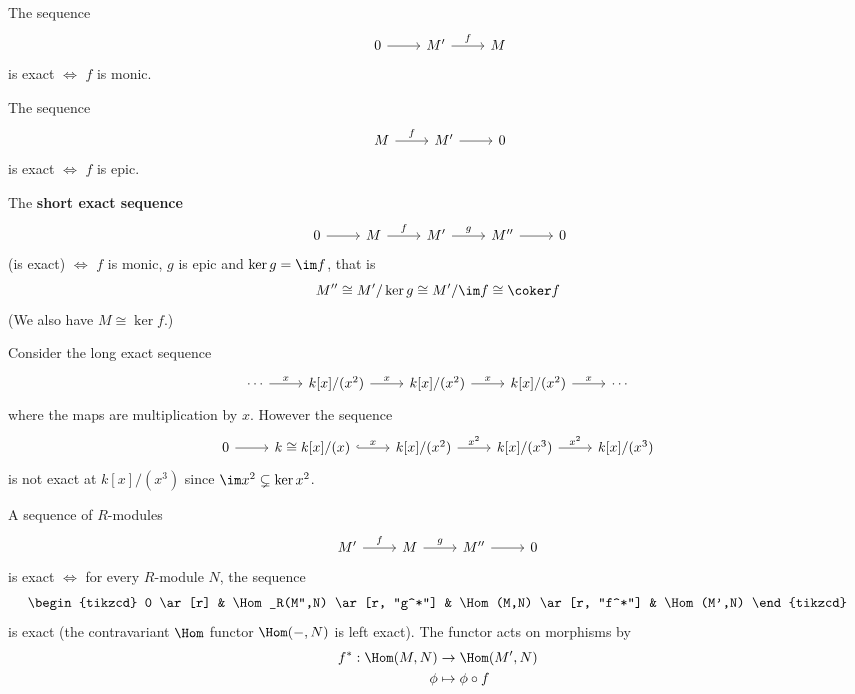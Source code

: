 \begin{exam}
	\begin{enum}
		\io The sequence
		\[\
		\begin{tikzcd}
			0 \ar[r] & M' \ar[r, "f"] & M
		\end{tikzcd}
		\]
		is exact $\iff$ $f$ is monic.
		
		\io The sequence
		\[\
		\begin{tikzcd}
			M \ar[r, "f"] & M' \ar[r] & 0
		\end{tikzcd}
		\]
		is exact $\iff$ $f$ is epic.
		
		\io The \textbf{short exact sequence}
		\[\
		\begin{tikzcd}
			0 \ar[r] & M \ar[r, "f"] & M' \ar[r, "g"] & M'' \ar[r] & 0
		\end{tikzcd}
		\]
		(is exact) $\iff$ $f$ is monic, $g$ is epic and $\ker g = \im f$, that is
		\[M'' \cong M'/\ker g \cong M'/\im f \cong \coker f\]
		(We also have $M \cong \ker f$.)
		
		\io Consider the long exact sequence
		\[
		\begin{tikzcd}
			\cdots \ar[r, "x"] & k[x]/(x^2) \ar[r, "x"] & k[x]/(x^2) \ar[r, "x"] & k[x]/(x^2) \ar[r, "x"] & \cdots
		\end{tikzcd}
		\]
		where the maps are multiplication by $x$.
		However the sequence
		\[
		\begin{tikzcd}
			0 \ar[r] & k \cong k[x]/(x) \ar[r, hookrightarrow, "x"] & k[x]/(x^2) \ar[r, "x^2"] & k[x]/(x^3) \ar[r, "x^2"] & k[x]/(x^3)
		\end{tikzcd}
		\]
		is not exact at $k[x]/(x^3)$ since $\im x^2 \subsetneq \ker x^2$.
	\end{enum}
\end{exam}

\begin{prop}[1.10]
	A sequence of $R$-modules
	\[
	\begin{tikzcd}
		M' \ar[r, "f"] & M \ar[r, "g"] & M'' \ar[r] & 0
	\end{tikzcd}
	\]
	is exact $\iff$ for every $R$-module $N$, the sequence
	\[
	\begin{tikzcd}
	0 \ar[r] & \Hom_R(M'',N) \ar[r, "g^*"] & \Hom(M,N) \ar[r, "f^*"] & \Hom(M',N)
	\end{tikzcd}
	\]
	is exact (the contravariant $\Hom$ functor $\Hom(-,N)$ is left exact).
	The functor acts on morphisms by
	\begin{align*}
		f^*: \Hom(M,N) &\to \Hom(M',N) \\
		\phi &\mapsto \phi \circ f
	\end{align*}
\end{prop}